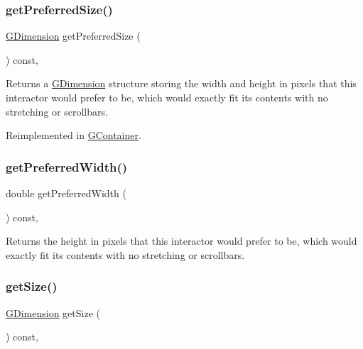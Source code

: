 \subsubsection{\texorpdfstring{get\+Preferred\+Size()}{getPreferredSize()}}
{\footnotesize\ttfamily \mbox{\hyperlink{classGDimension}{G\+Dimension}} get\+Preferred\+Size (\begin{DoxyParamCaption}{ }\end{DoxyParamCaption}) const\hspace{0.3cm}{\ttfamily [virtual]}, {\ttfamily [inherited]}}



Returns a \mbox{\hyperlink{classGDimension}{G\+Dimension}} structure storing the width and height in pixels that this interactor would prefer to be, which would exactly fit its contents with no stretching or scrollbars. 



Reimplemented in \mbox{\hyperlink{classGContainer_a21904b305edacd8f871d6951cb8d3fa5}{G\+Container}}.

\mbox{\label{classGInteractor_a82bca31d37700fb0e35d2743352efd5e}} 
\subsubsection{\texorpdfstring{get\+Preferred\+Width()}{getPreferredWidth()}}
{\footnotesize\ttfamily double get\+Preferred\+Width (\begin{DoxyParamCaption}{ }\end{DoxyParamCaption}) const\hspace{0.3cm}{\ttfamily [virtual]}, {\ttfamily [inherited]}}



Returns the height in pixels that this interactor would prefer to be, which would exactly fit its contents with no stretching or scrollbars. 

\mbox{\label{classGInteractor_a7b4eec96a2bdc6420695d5796a78eea9}} 
\subsubsection{\texorpdfstring{get\+Size()}{getSize()}}
{\footnotesize\ttfamily \mbox{\hyperlink{classGDimension}{G\+Dimension}} get\+Size (\begin{DoxyParamCaption}{ }\end{DoxyParamCaption}) const\hspace{0.3cm}{\ttfamily [virtual]}, {\ttfamily [inherited]}}



